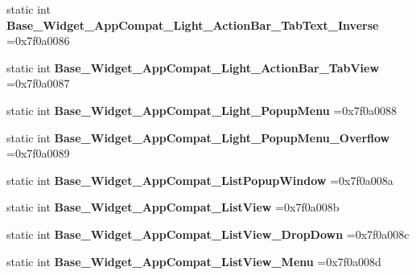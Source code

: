 \begin{DoxyCompactItemize}
static int {\bfseries Base\+\_\+\+Widget\+\_\+\+App\+Compat\+\_\+\+Light\+\_\+\+Action\+Bar\+\_\+\+Tab\+Text\+\_\+\+Inverse} =0x7f0a0086
\item 
\mbox{\label{classandroid_1_1support_1_1v7_1_1cardview_1_1R_1_1style_ad01ddbd99ef59c299347b5d36cf1f96f}} 
static int {\bfseries Base\+\_\+\+Widget\+\_\+\+App\+Compat\+\_\+\+Light\+\_\+\+Action\+Bar\+\_\+\+Tab\+View} =0x7f0a0087
\item 
\mbox{\label{classandroid_1_1support_1_1v7_1_1cardview_1_1R_1_1style_a4d0693861781c1f309463989b6a513bb}} 
static int {\bfseries Base\+\_\+\+Widget\+\_\+\+App\+Compat\+\_\+\+Light\+\_\+\+Popup\+Menu} =0x7f0a0088
\item 
\mbox{\label{classandroid_1_1support_1_1v7_1_1cardview_1_1R_1_1style_a944b94f5bf0e9d1bd6545d75b09a38c8}} 
static int {\bfseries Base\+\_\+\+Widget\+\_\+\+App\+Compat\+\_\+\+Light\+\_\+\+Popup\+Menu\+\_\+\+Overflow} =0x7f0a0089
\item 
\mbox{\label{classandroid_1_1support_1_1v7_1_1cardview_1_1R_1_1style_a2cce2dbe017843a804e646d485b009e3}} 
static int {\bfseries Base\+\_\+\+Widget\+\_\+\+App\+Compat\+\_\+\+List\+Popup\+Window} =0x7f0a008a
\item 
\mbox{\label{classandroid_1_1support_1_1v7_1_1cardview_1_1R_1_1style_ae5cb367988b973cd8a63e9fe499672fa}} 
static int {\bfseries Base\+\_\+\+Widget\+\_\+\+App\+Compat\+\_\+\+List\+View} =0x7f0a008b
\item 
\mbox{\label{classandroid_1_1support_1_1v7_1_1cardview_1_1R_1_1style_a88f624af3cf7721be1b1373452fc3f83}} 
static int {\bfseries Base\+\_\+\+Widget\+\_\+\+App\+Compat\+\_\+\+List\+View\+\_\+\+Drop\+Down} =0x7f0a008c
\item 
\mbox{\label{classandroid_1_1support_1_1v7_1_1cardview_1_1R_1_1style_acdc20b78a9e78ae63cea0baaee1c73fa}} 
static int {\bfseries Base\+\_\+\+Widget\+\_\+\+App\+Compat\+\_\+\+List\+View\+\_\+\+Menu} =0x7f0a008d

\end{DoxyCompactItemize}
